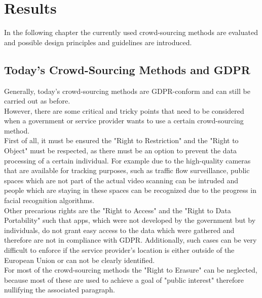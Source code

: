 \documentclass[a4paper,12pt]{report}
\begin{document}
	\chapter{Results}
	In the following chapter the currently used crowd-sourcing methods are evaluated and possible design principles and guidelines are introduced.
	
	\section{Today's Crowd-Sourcing Methods and GDPR} \label{juxtaposition}
	\startsection
		Generally, today's crowd-sourcing methods are GDPR-conform and can still be carried out as before. \\
		However, there are some critical and tricky points that need to be considered when a government or service provider wants to use a certain crowd-sourcing method. \\
		First of all, it must be ensured the "Right to Restriction" and the "Right to Object" must be respected, as there must be an option to prevent the data processing of a certain individual. For example due to the high-quality cameras that are available for tracking purposes, such as traffic flow surveillance, public spaces which are not part of the actual video scanning can be intruded and people which are staying in these spaces can be recognized due to the progress in facial recognition algorithms. \\
		Other precarious rights are the "Right to Access" and the "Right to Data Portability" such that apps, which were not developed by the government but by individuals, do not grant easy access to the data which were gathered and therefore are not in compliance with GDPR. Additionally, such cases can be very difficult to enforce if the service provider's location is either outside of the European Union or can not be clearly identified. \\
		For most of the crowd-sourcing methods the "Right to Erasure" can be neglected, because most of these are used to achieve a goal of "public interest" therefore nullifying the associated paragraph.
	\closesection
	
\end{document}

